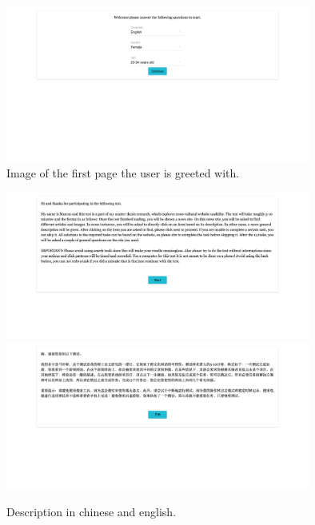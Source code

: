 \begin{figure}[h]
	\centering
	\includegraphics[width=100mm]{Images/homepage.png}
	\decoRule
	\caption[Homepage]{Image of the first page the user is greeted with. }
	\label{fig:homepage}
\end{figure}

\begin{figure}[h]
	\centering
	\includegraphics[width=100mm]{Images/homepage_text_en.png}
	\includegraphics[width=100mm]{Images/homepage_text_zh.png}
	\decoRule
	\caption[Homepage]{Description in chinese and english.}
	\label{fig:homepage_desc}
\end{figure}
